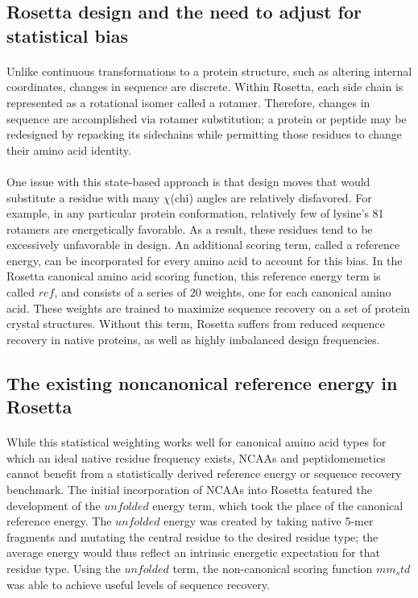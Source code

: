 \subsection{Rosetta design and the need to adjust for statistical bias}
\paragraph{}
Unlike continuous transformations to a protein structure, such as altering internal coordinates, changes in sequence are discrete.
Within Rosetta, each side chain is represented as a rotational isomer called a rotamer.
Therefore, changes in sequence are accomplished via rotamer substitution; a protein or peptide may be redesigned by repacking its sidechains while permitting those residues to change their amino acid identity\cite{leaver-fay_chapter_2011}.

\paragraph{}
One issue with this state-based approach is that design moves that would substitute a residue with many $\chi$(chi) angles are relatively disfavored. For example, in any particular protein conformation, relatively few of lysine's 81 rotamers are energetically favorable.
As a result, these residues tend to be excessively unfavorable in design\cite{leaver-fay_chapter_2013,rohl_protein_2004}.
An additional scoring term, called a reference energy, can be incorporated for every amino acid to account for this bias. 
In the Rosetta canonical amino acid scoring function, this reference energy term is called $ref$, and consists of a series of 20 weights, one for each canonical amino acid.
These weights are trained to maximize sequence recovery on a set of protein crystal structures.
Without this term, Rosetta suffers from reduced sequence recovery in native proteins, as well as highly imbalanced design frequencies\cite{rohl_protein_2004}.

\subsection{The existing noncanonical reference energy in Rosetta}

\paragraph{}
While this statistical weighting works well for canonical amino acid types for which an ideal native residue frequency exists, NCAAs and peptidomemetics cannot benefit from a statistically derived reference energy or sequence recovery benchmark.
The initial incorporation of NCAAs into Rosetta featured the development of the $unfolded$ energy term, which took the place of the canonical reference energy\cite{renfrew_incorporation_2012}.
The $unfolded$ energy was created by taking native 5-mer fragments and mutating the central residue to the desired residue type; the average energy would thus reflect an intrinsic energetic expectation for that residue type.
Using the $unfolded$ term, the non-canonical scoring function $mm_std$ was able to achieve useful levels of sequence recovery.

